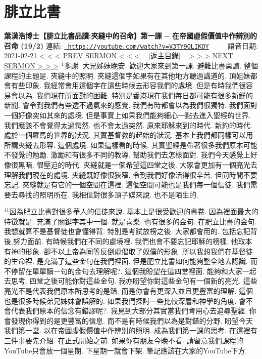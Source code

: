 \documentclass{book}
\begin{document}
\section{腓立比書}
\label{sec:V3TY9OLIKOY}
\textbf{葉漢浩博士【腓立比書品讀:夾縫中的召命】第一課 ─ 在帝國虛假價值中作辨別的召命 (19/2)}
\newline
\newline
連結: \href{https://youtube.com/watch?v=V3TY9OLIKOY}{\texttt{ https://youtube.com/watch?v=V3TY9OLIKOY}} ~~~~ 語音日期: 2021-02-21 
\newline
\newline
\hyperref[sec:ppW_QhbWCCE]{\small{< < < PREV SERMON < < <}}
~
\hyperref[sec:index]{\small{[返主目錄]}}
~
\hyperref[sec:Y_0nqRPjKNA]{\small{> > > NEXT SERMON > > >}}
\newline
\newline
$^{1}$多謝.
大兄姊妹晚安.
歡迎大家來到第一課.
避難比書稟讀.
整個課程的主題是.
夾縫中的照明.
夾縫這個字如果有在其他地方聽過講道的.
頂姐妹都會有些印象.
我經常會用這個字在這些時候去形容我們的處境.
但是有時我們很容易會以為.
我們現在所面對的困難.
特別是香港現在我們每日都可能有很多新鮮的新聞.
會令到我們有些透不過氣來的感覺.
我們有時都會以為我們很獨特.
我們面對一個好像突如其來的處境.
但是事實上如果我們能夠細心一點去進入聖經的世界.
我們應該不會覺得太過愕然.
也不會太過突然.
原來耶穌來到的時代.
新約的時代.
處於一個羅馬的世界的狀況.
其實基督教的起始的狀況.
基本上我們都同樣可以用所謂夾縫去形容.
這個處境.
如果這樣看的時候.
其實聖經是帶著很多我們原本可能不發覺的勉勵.
激勵和有很多不同的教導.
幫助我們去怎樣面對.
我們今天感覺上好像很黑暗.
很壓迫的時代.
夾縫就是一個希望這四堂之後.
大家會更加有一個亮光去理解我們現在的處境.
夾縫既好像很狹窄.
令到我們好像活得很辛苦.
但同時間不要忘記.
夾縫就是有它的一個空間在這裡.
這個空間可能也是我們每一個信徒.
我們需要去尋找的照明所在.
我相信對很多頂子媒來說.
也不是陌生的.

$^{41}$因為肥立比書對很多華人的信徒來說.
基本上是很受歡迎的書卷.
因為裡面最大的特徵就是.
充滿了關鍵字其中一個.
就是喜樂.
也有很多的金句.
在肥立比書的金句.
我想就算不是基督徒也會懂得背.
特別是考試放榜之後.
大家都會用的.
包括忘記背後,努力面前.
有時候我們在不同的處境裡.
我們也會不要忘記耶穌的榜樣.
他取本有神的形象.
卻不以上帝為同等反倒虛偈取了奴僕的形象.
所以我想我們在基督徒的生命裡.
是充滿了這些金句在我們裡面.
但是肥立比書如何能夠整全地去認識.
而不停留在單單讀一句的金句去理解呢?.
這個我盼望在這四堂裡面.
能夠和大家一起去思考.
四堂之後可能你對這些金句.
我亦盼望你對這些金句有一個新的亮光.
這些亮光不是代表我們原本所思考的是錯.
而是你會有更深入並且更豐富的理解.
這個也是很多時候弟兄姊妹會誤解的.
如果我們探討一些比較深層和神學的角度.
會不會代表我們原本的信念有錯謬呢?.
我見到大部分其實當我們肯用心去追尋聖經.
你會發現你得到的是更豐富的信息.
而不是有時候我們以為是對錯的分野.
盼望今天我們第一堂.
以在帝國虛假價值中作辨別的照明.
成為我們第一課的思考.
在這裡有三件事要先介紹.
在正式開始之前.
如果你有朋友今晚不看.
請留意我們課程的YouTube只會放一個星期.
下星期一就會下架.
筆記應該在大家的YouTube下方.
\end{document}

